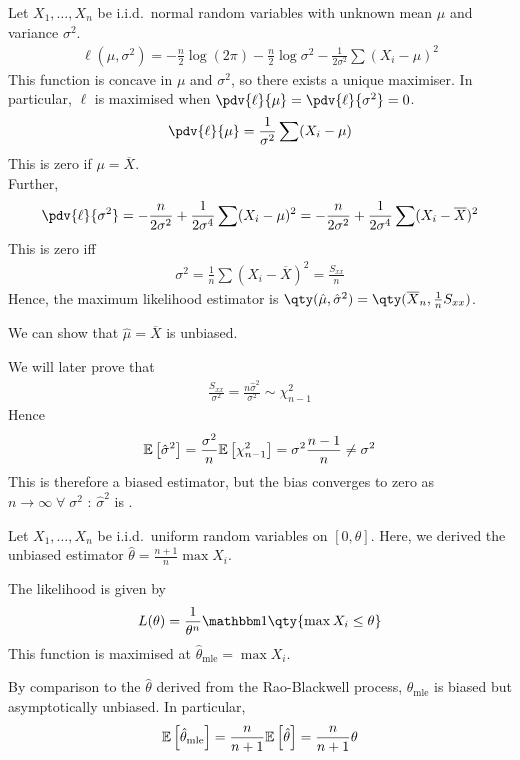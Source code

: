 \begin{example}
	Let $X_1, \dots, X_n$ be i.i.d.\ normal random variables with unknown mean $\mu$ and variance $\sigma^2$.
	\begin{align*}
		\ell(\mu, \sigma^2) = -\frac{n}{2} \log(2\pi) - \frac{n}{2} \log \sigma^2 - \frac{1}{2\sigma^2} \sum (X_i - \mu)^2
	\end{align*}
	This function is concave in $\mu$ and $\sigma^2$, so there exists a unique maximiser.
	In particular, $\ell$ is maximised when $\pdv{\ell}{\mu} = \pdv{\ell}{\sigma^2} = 0$.
	\begin{align*}
		\pdv{\ell}{\mu} = \frac{1}{\sigma^2} \sum (X_i - \mu)
	\end{align*}
	This is zero if $\mu = \overline X$. \\
	Further,
	\begin{align*}
		\pdv{\ell}{\sigma^2} = -\frac{n}{2\sigma^2} + \frac{1}{2\sigma^4} \sum (X_i - \mu)^2 = -\frac{n}{2\sigma^2} + \frac{1}{2\sigma^4} \sum (X_i - \overline X)^2
	\end{align*}
	This is zero iff
	\begin{align*}
		\sigma^2 = \frac{1}{n} \sum (X_i - \overline X)^2 = \frac{S_{xx}}{n}
	\end{align*}
	Hence, the maximum likelihood estimator is $\qty(\hat \mu, \hat \sigma^2) = \qty(\overline X_n, \frac{1}{n} S_{xx})$.

	We can show that $\hat \mu = \overline{X}$ is unbiased.

	We will later prove that
	\begin{align*}
		\frac{S_{xx}}{\sigma^2} = \frac{n\hat \sigma^2}{\sigma^2} \sim \chi_{n-1}^2
	\end{align*}
	Hence
	\begin{align*}
		\mathbb{E}\left[{\hat \sigma^2}\right] = \frac{\sigma^2}{n} \mathbb{E}\left[{\chi_{n-1}^2}\right] = \sigma^2 \frac{n-1}{n} \neq \sigma^2
	\end{align*}
	This is therefore a biased estimator, but the bias converges to zero as $n \to \infty \; \forall \; \sigma^2$ : $\hat \sigma^2$ is .
\end{example}

\begin{example}
	Let $X_1, \dots, X_n$ be i.i.d.\ uniform random variables on $[0,\theta]$.
	Here, we derived the unbiased estimator $\hat \theta = \frac{n+1}{n} \max X_i$.

	The likelihood is given by
	\begin{align*}
		L(\theta) = \frac{1}{\theta^n} \mathbbm 1\qty{\max X_i \leq \theta}
	\end{align*}
	This function is maximised at $\hat \theta_{\mathrm{mle}} = \max X_i$.

	By comparison to the $\hat \theta$ derived from the Rao-Blackwell process, $\hat \theta_{\mathrm{mle}}$ is biased but asymptotically unbiased.
	In particular,
	\begin{align*}
		\mathbb{E}\left[{\hat \theta_{\mathrm{mle}}}\right] = \frac{n}{n+1} \mathbb{E}\left[{\hat \theta}\right] = \frac{n}{n+1} \theta
	\end{align*}
\end{example}

